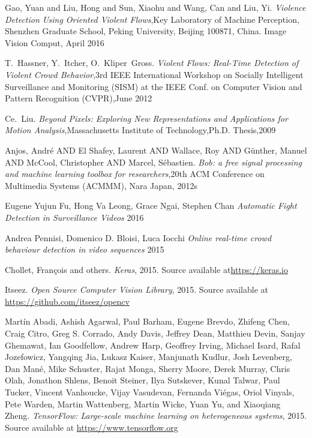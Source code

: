 \cleardoublepage
{}
{}
\begin{thebibliography}{99}
Gao, Yuan and Liu, Hong and Sun, Xiaohu and Wang, Can and Liu, Yi. \emph{Violence Detection Using Oriented Violent Flows},Key Laboratory of Machine Perception, Shenzhen Graduate School, Peking University, Beijing 100871, China. Image Vision Comput, April 2016

T.~Hassner, Y.~Itcher, O.~Kliper~Gross. \emph{Violent Flows: Real-Time Detection of Violent Crowd Behavior},3rd IEEE International Workshop on Socially Intelligent Surveillance and Monitoring (SISM) at the IEEE Conf. on Computer Vision and Pattern Recognition (CVPR),June 2012

Ce.~Liu. \emph{Beyond Pixels: Exploring New Representations and Applications for Motion Analysis},Massachusetts Institute of Technology,Ph.D. Thesis,2009

Anjos, Andr\'e AND El Shafey, Laurent AND Wallace, Roy AND G\"unther, Manuel AND McCool, Christopher AND Marcel, S\'ebastien. \emph{Bob: a free signal processing and machine learning toolbox for researchers},20th ACM Conference on Multimedia Systems (ACMMM), Nara Japan, 2012s

Eugene Yujun Fu, Hong Va Leong, Grace Ngai, Stephen Chan \emph{Automatic Fight Detection in Surveillance Videos} 2016

Andrea Pennisi, Domenico D. Bloisi, Luca Iocchi \emph{Online real-time crowd behaviour detection in video sequences} 2015

Chollet, Fran\c{c}ois and others. \emph{Keras}, 2015. Source available at\url{https://keras.io}

Itseez. \emph{Open Source Computer Vision Library}, 2015. Source available at \url{https://github.com/itseez/opencv}

Martín Abadi, Ashish Agarwal, Paul Barham, Eugene Brevdo,
Zhifeng Chen, Craig Citro, Greg S. Corrado, Andy Davis,
Jeffrey Dean, Matthieu Devin, Sanjay Ghemawat, Ian Goodfellow,
Andrew Harp, Geoffrey Irving, Michael Isard, Rafal Jozefowicz, Yangqing Jia,
Lukasz Kaiser, Manjunath Kudlur, Josh Levenberg, Dan Mané, Mike Schuster,
Rajat Monga, Sherry Moore, Derek Murray, Chris Olah, Jonathon Shlens,
Benoit Steiner, Ilya Sutskever, Kunal Talwar, Paul Tucker,
Vincent Vanhoucke, Vijay Vasudevan, Fernanda Viégas,
Oriol Vinyals, Pete Warden, Martin Wattenberg, Martin Wicke,
Yuan Yu, and Xiaoqiang Zheng.
\emph{TensorFlow: Large-scale machine learning on heterogeneous systems}, 2015. Source available at \url{ https://www.tensorflow.org}







\end{thebibliography}
